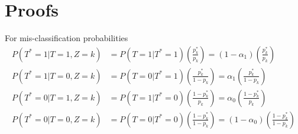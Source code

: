 \section{Proofs}

\begin{lem}
For mis-classification probabilities
\begin{align*}
  P(T^*=1|T=1, Z=k) &= P(T=1 | T^*=1) \left(\frac{p_k^*}{p_k}\right) = (1 - \alpha_1)\left( \frac{p_k^*}{p_k} \right)\\
  P(T^*=1|T=0, Z=k) &= P(T=0 | T^*=1) \left(\frac{p_k^*}{1 - p_k}\right) = \alpha_1 \left( \frac{p_k^*}{1 - p_k} \right)\\
  P(T^*=0|T=1, Z=k) &= P(T=1 | T^*=0) \left(\frac{1 - p_k^*}{p_k}\right) = \alpha_0 \left( \frac{1 - p_k^*}{p_k} \right)\\
  P(T^*=0|T=0, Z=k) &= P(T=0 | T^*=0) \left(\frac{1 - p_k^*}{1 - p_k}\right) = (1 - \alpha_0)\left( \frac{1 - p_k^*}{1 - p_k} \right)
\end{align*}
\end{lem}


